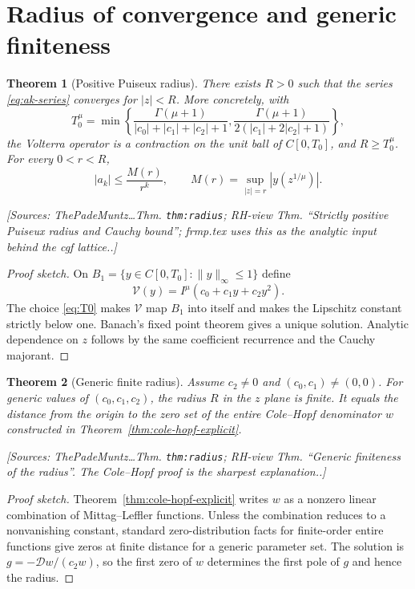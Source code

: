 \documentclass[11pt]{article}
\newtheorem{theorem}{Theorem}[section]
\theoremstyle{definition}
\newcommand{\Dc}{\mathcal{D}}
\newcommand{\Source}[1]{\par\smallskip\noindent\textup{[Sources: #1.]}}
\begin{document}
\section{Radius of convergence and generic finiteness}

\begin{theorem}[Positive Puiseux radius]\label{thm:radius}
There exists $R>0$ such that the series \eqref{eq:ak-series} converges for $|z|<R$.
More concretely,
with
\begin{equation}\label{eq:T0}
        T_0^{\mu}=\min\left\{
        \frac{\Gamma(\mu+1)}{|c_0|+|c_1|+|c_2|+1},
        \frac{\Gamma(\mu+1)}{2(|c_1|+2|c_2|+1)}
        \right\},
\end{equation}
the Volterra operator is a contraction on the unit ball of $C[0,T_0]$,
and $R\ge T_0^{\mu}$.
For every $0<r<R$,
\begin{equation}\label{eq:cauchy-ak}
        |a_k|\le \frac{M(r)}{r^k},
        \qquad
        M(r)=\sup_{|z|=r}|y(z^{1/\mu})|.
\end{equation}
\Source{ThePadeMuntz\ldots Thm. \texttt{thm:radius}; RH-view Thm. ``Strictly positive Puiseux radius and Cauchy bound''; frmp.tex uses this as the analytic input behind the cgf lattice.}
\end{theorem}

\begin{proof}[Proof sketch]
On $B_1=\{y\in C[0,T_0]:\|y\|_\infty\le1\}$ define
\[
        \mathcal{V}(y)=I^{\mu}(c_0+c_1y+c_2y^2).
\]
The choice \eqref{eq:T0} makes $\mathcal{V}$ map $B_1$ into itself and makes the Lipschitz constant strictly below one.
Banach's fixed point theorem gives a unique solution.
Analytic dependence on $z$ follows by the same coefficient recurrence and the Cauchy majorant.
\end{proof}

\begin{theorem}[Generic finite radius]\label{thm:generic-finite}
Assume $c_2\ne0$ and $(c_0,c_1)\ne(0,0)$.
For generic values of $(c_0,c_1,c_2)$,
the radius $R$ in the $z$ plane is finite.
It equals the distance from the origin to the zero set of the entire Cole--Hopf denominator $w$ constructed in Theorem~\ref{thm:cole-hopf-explicit}.
\Source{ThePadeMuntz\ldots Thm. \texttt{thm:radius}; RH-view Thm. ``Generic finiteness of the radius''. The Cole--Hopf proof is the sharpest explanation.}
\end{theorem}

\begin{proof}[Proof sketch]
Theorem~\ref{thm:cole-hopf-explicit} writes $w$ as a nonzero linear combination of Mittag--Leffler functions.
Unless the combination reduces to a nonvanishing constant,
standard zero-distribution facts for finite-order entire functions give zeros at finite distance for a generic parameter set.
The solution is $g=-\Dc w/(c_2w)$,
so the first zero of $w$ determines the first pole of $g$ and hence the radius.
\end{proof}
\end{document}
